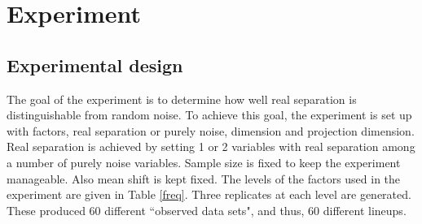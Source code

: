 %
%






\section{Experiment} \label{sec:experiment}

\subsection{Experimental design}


The goal of the experiment is to determine how well real separation is distinguishable from random noise. To achieve this goal, the experiment is set up with factors, real separation or purely noise, dimension and projection dimension. Real separation is achieved by setting 1 or 2 variables with real separation among a number of purely noise variables.  Sample size is fixed to keep the experiment manageable. Also mean shift is kept fixed. The levels of the factors used in the experiment are given in Table \ref{freq}. Three replicates at each level are generated. These produced 60 different ``observed data sets", and thus, 60 different lineups. 

